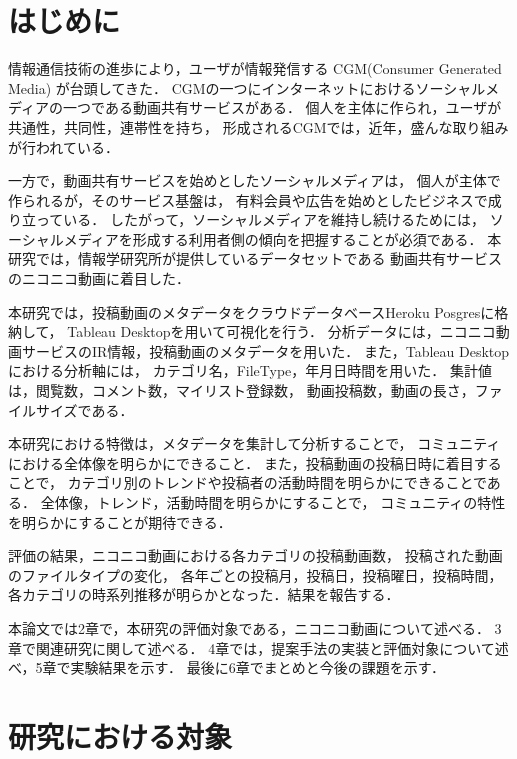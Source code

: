 \documentclass[submit,techrep,noauthor]{ipsj}
\begin{document}
\maketitle

\section{はじめに}
情報通信技術の進歩により，ユーザが情報発信する
CGM(Consumer Generated Media) が台頭してきた．
CGMの一つにインターネットにおけるソーシャルメディアの一つである動画共有サービスがある．
%
個人を主体に作られ，ユーザが共通性，共同性，連帯性を持ち，
形成されるCGMでは，近年，盛んな取り組みが行われている．

一方で，動画共有サービスを始めとしたソーシャルメディアは，
個人が主体で作られるが，そのサービス基盤は，
有料会員や広告を始めとしたビジネスで成り立っている．
%
したがって，ソーシャルメディアを維持し続けるためには，
ソーシャルメディアを形成する利用者側の傾向を把握することが必須である．
本研究では，情報学研究所が提供しているデータセットである
動画共有サービスのニコニコ動画に着目した．

本研究では，投稿動画のメタデータをクラウドデータベースHeroku Posgresに格納して，
Tableau Desktopを用いて可視化を行う．
分析データには，ニコニコ動画サービスのIR情報，投稿動画のメタデータを用いた．
また，Tableau Desktopにおける分析軸には，
カテゴリ名，FileType，年月日時間を用いた．
集計値は，閲覧数，コメント数，マイリスト登録数，
動画投稿数，動画の長さ，ファイルサイズである．

本研究における特徴は，メタデータを集計して分析することで，
コミュニティにおける全体像を明らかにできること．
また，投稿動画の投稿日時に着目することで，
カテゴリ別のトレンドや投稿者の活動時間を明らかにできることである．
全体像，トレンド，活動時間を明らかにすることで，
コミュニティの特性を明らかにすることが期待できる．

評価の結果，ニコニコ動画における各カテゴリの投稿動画数，
投稿された動画のファイルタイプの変化，
各年ごとの投稿月，投稿日，投稿曜日，投稿時間，
各カテゴリの時系列推移が明らかとなった．結果を報告する．

本論文では2章で，本研究の評価対象である，ニコニコ動画について述べる．
3章で関連研究に関して述べる．
%
4章では，提案手法の実装と評価対象について述べ，5章で実験結果を示す．
最後に6章でまとめと今後の課題を示す．

\section{研究における対象}
\end{document}
